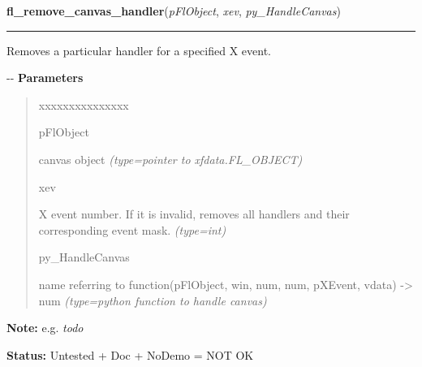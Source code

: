 \hspace{.8\funcindent}\begin{boxedminipage}{\funcwidth}

    \raggedright \textbf{fl\_remove\_canvas\_handler}(\textit{pFlObject}, \textit{xev}, \textit{py\_HandleCanvas})

    \vspace{-1.5ex}

    \rule{\textwidth}{0.5\fboxrule}
\setlength{\parskip}{2ex}

Removes a particular handler for a specified X event.

-{}-
\setlength{\parskip}{1ex}
      \textbf{Parameters}
      \vspace{-1ex}

      \begin{quote}
        \begin{Ventry}{xxxxxxxxxxxxxxx}

          \item[pFlObject]


canvas object
            {\it (type=pointer to xfdata.FL\_OBJECT)}

          \item[xev]


X event number. If it is invalid, removes all handlers and their
corresponding event mask.
            {\it (type=int)}

          \item[py\_HandleCanvas]


name referring to  function(pFlObject, win, num, num, pXEvent,
vdata) -> num
            {\it (type=python function to handle canvas)}

        \end{Ventry}

      \end{quote}

\textbf{Note:} 
e.g. \emph{todo}


\textbf{Status:} 
Untested + Doc + NoDemo = NOT OK


    \end{boxedminipage}

    \label{xformslib:flcanvas:fl_hide_canvas}

    \vspace{0.5ex}

